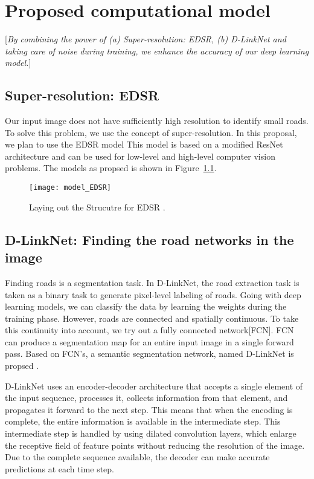 \chapter{Proposed computational model}\label{chapt:model}
[\textit{By combining the power of (a) Super-resolution: EDSR, (b) D-LinkNet and taking care of noise during training, we enhance the accuracy of our deep learning model.}]

\section{Super-resolution: EDSR}
Our input image does not have sufficiently high resolution to identify small roads. To solve this problem, we use the concept of super-resolution. In this proposal, we plan to use the EDSR model %
This model is based on a modified ResNet architecture and can be used for low-level and high-level computer vision problems. The models as propsed \cite{EDSR} is shown in Figure~\ref{fig:model_EDSR}.

\begin{figure}[h!]
  \centering
  \texttt{[image: model\_EDSR]}
  \caption{Laying out the Strucutre for EDSR \cite{EDSR}.}
  \label{fig:model_EDSR}
\end{figure}

\section{D-LinkNet: Finding the road networks in the image}
Finding roads is a segmentation task. In D-LinkNet, the road extraction task is taken as a binary task to generate pixel-level labeling of roads. Going with deep learning models, we can classify the data by learning the weights during the training phase. However, roads are connected and spatially continuous. To take this continuity into account, we try out a fully connected network[FCN]. FCN can produce a segmentation map for an entire input image in a single forward pass. Based on FCN's, a semantic segmentation network, named D-LinkNet is propsed \cite{D-LinkNet}.

D-LinkNet uses an encoder-decoder architecture that accepts a single element of the input sequence, processes it, collects information from that element, and propagates it forward to the next step. This means that when the encoding is complete, the entire information is available in the intermediate step. This intermediate step is handled by using dilated convolution layers, which enlarge the receptive field of feature points without reducing the resolution of the image. Due to the complete sequence available, the decoder can make accurate predictions at each time step.

